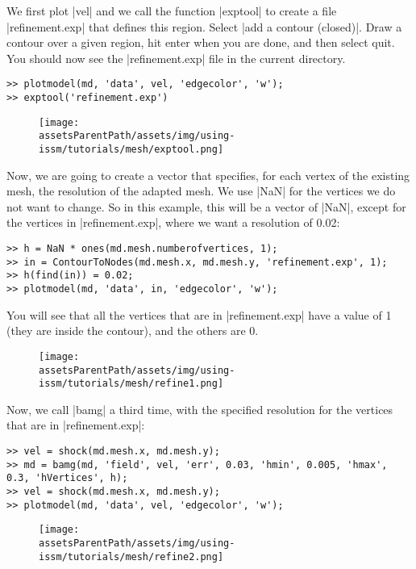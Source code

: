 We first plot \lstinlinebg|vel| and we call the function \lstinlinebg|exptool| to create a file \lstinlinebg|refinement.exp| that defines this region. Select \lstinlinebg|add a contour (closed)|. Draw a contour over a given region, hit enter when you are done, and then select quit. You should now see the \lstinlinebg|refinement.exp| file in the current directory.
\begin{lstlisting}
>> plotmodel(md, 'data', vel, 'edgecolor', 'w');
>> exptool('refinement.exp')
\end{lstlisting}
\begin{figure}[H]
	\begin{center}
		\texttt{[image: \\assetsParentPath/assets/img/using-issm/tutorials/mesh/exptool.png]}
	\end{center}
\end{figure}

Now, we are going to create a vector that specifies, for each vertex of the existing mesh, the resolution of the adapted mesh. We use \lstinlinebg|NaN| for the vertices we do not want to change. So in this example, this will be a vector of \lstinlinebg|NaN|, except for the vertices in \lstinlinebg|refinement.exp|, where we want a resolution of 0.02:
\begin{lstlisting}
>> h = NaN * ones(md.mesh.numberofvertices, 1);
>> in = ContourToNodes(md.mesh.x, md.mesh.y, 'refinement.exp', 1);
>> h(find(in)) = 0.02;
>> plotmodel(md, 'data', in, 'edgecolor', 'w');
\end{lstlisting}
You will see that all the vertices that are in \lstinlinebg|refinement.exp| have a value of 1 (they are inside the contour), and the others are 0.
\begin{figure}[H]
	\begin{center}
		\texttt{[image: \\assetsParentPath/assets/img/using-issm/tutorials/mesh/refine1.png]}
	\end{center}
\end{figure}

Now, we call \lstinlinebg|bamg| a third time, with the specified resolution for the vertices that are in \lstinlinebg|refinement.exp|:
\begin{lstlisting}
>> vel = shock(md.mesh.x, md.mesh.y);
>> md = bamg(md, 'field', vel, 'err', 0.03, 'hmin', 0.005, 'hmax', 0.3, 'hVertices', h);
>> vel = shock(md.mesh.x, md.mesh.y);
>> plotmodel(md, 'data', vel, 'edgecolor', 'w');
\end{lstlisting}
\begin{figure}[H]
	\begin{center}
		\texttt{[image: \\assetsParentPath/assets/img/using-issm/tutorials/mesh/refine2.png]}
	\end{center}
\end{figure}


